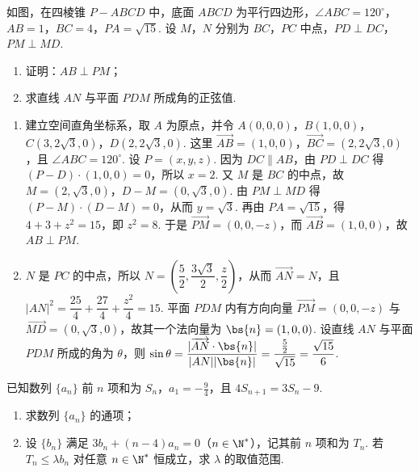 \begin{problem}
如图，在四棱锥 \(P-ABCD\) 中，底面 \(ABCD\) 为平行四边形，\(\angle ABC=120^\circ\)，
\(AB=1\)，\(BC=4\)，\(PA=\sqrt{15}\).
设 \(M\)，\(N\) 分别为 \(BC\)，\(PC\) 中点，\(PD\perp DC\)，\(PM\perp MD\).

\begin{enumerate}
\item 证明：\(AB\perp PM\)；

\item 求直线 \(AN\) 与平面 \(PDM\) 所成角的正弦值.
\end{enumerate}

\end{problem}

\begin{solution}
\begin{enumerate}
\item 建立空间直角坐标系，取 \(A\) 为原点，并令
\(A(0,0,0)\)，\(B(1,0,0)\)，\(C(3,2\sqrt3,0)\)，\(D(2,2\sqrt3,0)\). 这里 \(\overrightarrow{AB}=(1,0,0)\)，\(\overrightarrow{BC}=(2,2\sqrt3,0)\)，且 \(\angle ABC=120^{\circ}\).
设 \(P=(x,y,z)\). 因为 \(DC\parallel AB\)，由 \(PD\perp DC\) 得
\((P-D)\cdot(1,0,0)=0\)，所以 \(x=2\). 又 \(M\) 是 \(BC\) 的中点，故 \(M=(2,\sqrt3,0)\)，\(D-M=(0,\sqrt3,0)\). 由 \(PM\perp MD\) 得
\((P-M)\cdot(D-M)=0\)，从而 \(y=\sqrt3\). 再由 \(PA=\sqrt{15}\)，得 \(4+3+z^{2}=15\)，即 \(z^{2}=8\).
于是 \(\overrightarrow{PM}=(0,0,-z)\)，而 \(\overrightarrow{AB}=(1,0,0)\)，故 \(AB\perp PM\).

\item \(N\) 是 \(PC\) 的中点，所以
\(N=\left(\dfrac52,\dfrac{3\sqrt3}{2},\dfrac z2\right)\)，从而 \(\overrightarrow{AN}=N\)，且
\(|AN|^{2}=\dfrac{25}{4}+\dfrac{27}{4}+\dfrac{z^{2}}4=15\).
平面 \(PDM\) 内有方向向量 \(\overrightarrow{PM}=(0,0,-z)\) 与 \(\overrightarrow{MD}=(0,\sqrt3,0)\)，故其一个法向量为 \(\bs{n}=(1,0,0)\). 设直线 \(AN\) 与平面 \(PDM\) 所成的角为 \(\theta\)，则
\(\sin\theta=\dfrac{|\overrightarrow{AN}\cdot\bs{n}|}{|AN||\bs{n}|}=\dfrac{\frac{5}{2}}{\sqrt{15}}=\dfrac{\sqrt{15}}6\).
\end{enumerate}
\end{solution}

\begin{problem}
已知数列 \(\{a_n\}\) 前 \(n\) 项和为 \(S_n\)，\(a_1=-\frac{9}{4}\)，且
\(4S_{n+1}=3S_n-9\).

\begin{enumerate}
\item 求数列 \(\{a_n\}\) 的通项；

\item 设 \(\{b_n\}\) 满足
\(3b_n+(n-4)a_n=0\)（\(n\in\N^*\)），记其前 \(n\) 项和为 \(T_n\). 若
\(T_n\le\lambda b_n\) 对任意 \(n\in\N^*\) 恒成立，求 \(\lambda\) 的取值范围.
\end{enumerate}
\end{problem}

